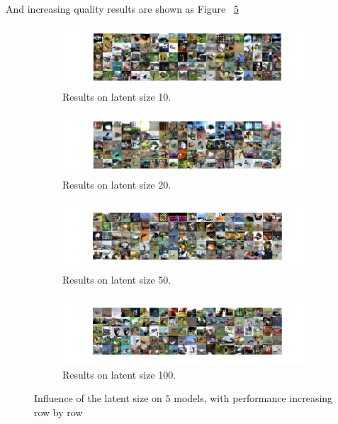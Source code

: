 \documentclass[12pt,letterpaper]{article}
\begin{document}
And increasing quality results are shown as Figure ~\ref{fig:CIFAR_GAN_latent}

\begin{figure}[h]
    \begin{subfigure}{0.495\textwidth}
    \includegraphics[width=\linewidth]{GAN_CIFAR_0_10_256.png}
    \caption{\small Results on latent size 10.} \label{fig:a}
    \end{subfigure}\hspace*{\fill}
    \begin{subfigure}{0.495\textwidth}
    \includegraphics[width=\linewidth]{GAN_CIFAR_0_20_256.png}
    \caption{\small Results on latent size 20.} \label{fig:b}
    \end{subfigure}
    
    \medskip
    \begin{subfigure}{0.495\textwidth}
    \includegraphics[width=\linewidth]{GAN_CIFAR_0_50_256.png}
    \caption{\small Results on latent size 50.} \label{fig:c}
    \end{subfigure}\hspace*{\fill}
    \begin{subfigure}{0.495\textwidth}
    \includegraphics[width=\linewidth]{GAN_CIFAR_0_100_256.png}
    \caption{\small Results on latent size 100.} \label{fig:d}
    \end{subfigure}
    \caption{Influence of the latent size on $5$ models, with performance increasing row by row} \label{fig:CIFAR_GAN_latent}
\end{figure}
\end{document}
